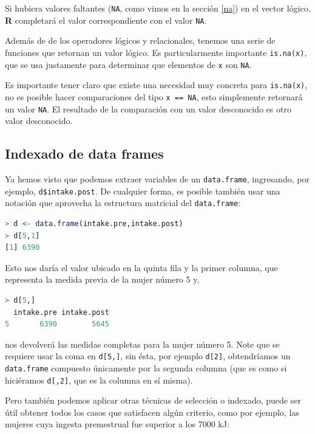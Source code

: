 \documentclass[spanish]{extbook}
\numberwithin{equation}{section}
\numberwithin{figure}{section}
\begin{document}
Si hubiera valores faltantes (\texttt{NA}, como vimos en la sección \ref{na})
en el vector lógico, \textbf{R} completará el valor correspondiente con el
valor \texttt{NA}.

Además de de los operadores lógicos y relacionales, tenemos una serie de
funciones que retornan un valor lógico. Es particularmente importante
\texttt{is.na(x)}, que se usa justamente para determinar que elementos de
\texttt{x} son \texttt{NA}.

Es importante tener claro que existe una necesidad muy concreta para
\texttt{is.na(x)}, no es posible hacer comparaciones del tipo \texttt{x == NA},
esto simplemente retornará un valor \texttt{NA}. El resultado de la comparación
con un valor desconocido es otro valor desconocido.

\subsection{Indexado de data frames}

Ya hemos visto que podemos extraer variables de un \texttt{data.frame},
ingresando, por ejemplo, \texttt{d\$intake.post}. De cualquier forma, es
posible también usar una notación que aprovecha la estructura matricial del
\texttt{data.frame}:

\begin{lstlisting}[language=R]
> d <- data.frame(intake.pre,intake.post)
> d[5,1]
[1] 6390
\end{lstlisting}

Esto nos daría el valor ubicado en la quinta fila y la primer columna, que
representa la medida previa de la mujer número 5 y,

\begin{lstlisting}[language=R]
> d[5,]
  intake.pre intake.post
5       6390        5645
\end{lstlisting}

nos devolverá las medidas completas para la mujer número 5. Note que se
requiere usar la coma en \texttt{d[5,]}, sin ésta, por ejemplo \texttt{d[2]},
obtendríamos un \texttt{data.frame} compuesto únicamente por la segunda columna
(que es como si hiciéramos \texttt{d[,2]}, que es la columna en sí misma).

Pero también podemos aplicar otras técnicas de selección o indexado, puede ser
útil obtener todos los casos que satisfacen algún criterio, como por ejemplo,
las mujeres cuya ingesta premestrual fue superior a los 7000 kJ:
\end{document}
